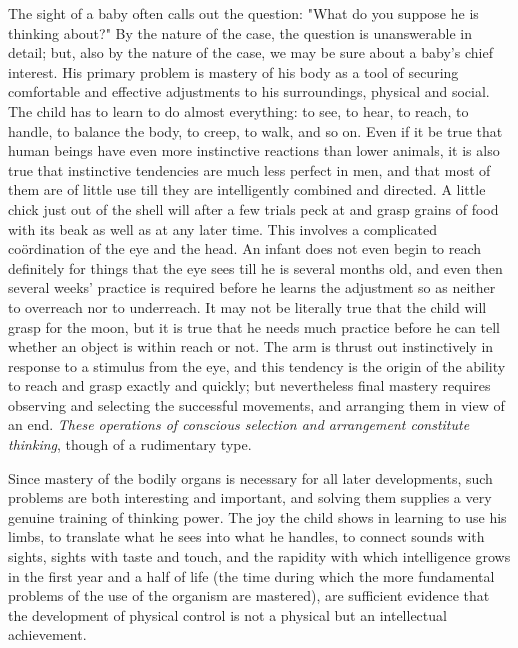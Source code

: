 \documentclass[showtrims,ustradepaper]{memoir}
\begin{document}
The sight of a baby often calls out the question: "What do you suppose
he is thinking about?" By the nature of the case, the question is
unanswerable in detail; but, also by the nature of the case, we may be
sure about a baby's chief interest. His primary problem is mastery of
his body as a tool of securing comfortable and effective adjustments to
his surroundings, physical and social. The child has to learn to do
almost everything: to see, to hear, to reach, to handle, to balance the
body, to creep, to walk, and so on. Even if it be true that human beings
have even more instinctive reactions than lower animals, it is also true
that instinctive tendencies are much less perfect in men, and that most
of them
are
of little use till they are intelligently combined and directed. A
little chick just out of the shell will after a few trials peck at and
grasp grains of food with its beak as well as at any later time. This
involves a complicated coördination of the eye and the head. An infant
does not even begin to reach definitely for things that the eye sees
till he is several months old, and even then several weeks' practice is
required before he learns the adjustment so as neither to overreach nor
to underreach. It may not be literally true that the child will grasp
for the moon, but it is true that he needs much practice before he can
tell whether an object is within reach or not. The arm is thrust out
instinctively in response to a stimulus from the eye, and this tendency
is the origin of the ability to reach and grasp exactly and quickly; but
nevertheless final mastery requires observing and selecting the
successful movements, and arranging them in view of an end. \emph{These
operations of conscious selection and arrangement constitute thinking},
though of a rudimentary type.


Since mastery of the bodily organs is necessary for all later
developments, such problems are both interesting and important, and
solving them supplies a very genuine training of thinking power. The joy
the child shows in learning to use his limbs, to translate what he sees
into what he handles, to connect sounds with sights, sights with taste
and touch, and the rapidity with which intelligence grows in the first
year and a half of life (the time during which the more fundamental
problems of the use of the organism are mastered), are sufficient
evidence that the development of physical control is not a physical but
an intellectual achievement.
\end{document}
